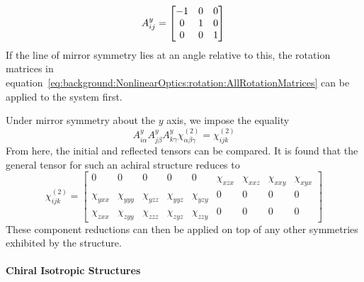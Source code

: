 \begin{equation}\label{eq:background:NonlinearOptics:mirror:yReflect}
	A^{y}_{ij} =
	\begin{bmatrix}
		-1 & 0 & 0\\ 
		0 & 1 & 0\\ 
		0 & 0 & 1
	\end{bmatrix}\\	
\end{equation}
If the line of mirror symmetry lies at an angle relative to this, the rotation matrices in equation~\ref{eq:background:NonlinearOptics:rotation:AllRotationMatrices} can be applied to the system first. 

Under mirror symmetry about the $y$ axis, we impose the equality
\begin{equation}\label{eq:background:NonlinearOptics:mirror:MirrorSymmetry}
	A^{y}_{i\alpha}A^{y}_{j\beta}A^{y}_{k\gamma}\chi^{(2)}_{\alpha \beta \gamma}
	=\chi^{(2)}_{ijk}
\end{equation}
From here, the initial and reflected tensors can be compared. It is found that the general tensor for such an achiral structure reduces to
\begin{equation}\label{eq:background:NonlinearOptics:mirror:chiMirrory}
	\chi^{(2)}_{ijk} =
	\begin{bmatrix}
		0 & 0 & 0 & 0 & 0 & \chi_{xzx} & \chi_{xxz} & \chi_{xxy} & \chi_{xyx}\\ 
		\chi_{yxx} & \chi_{yyy} & \chi_{yzz} & \chi_{yyz} & \chi_{yzy} & 0 & 0 & 0 & 0\\ 
		\chi_{zxx} & \chi_{zyy} & \chi_{zzz} & \chi_{zyz} & \chi_{zzy} & 0 & 0 & 0 & 0
	\end{bmatrix}
\end{equation}
These component reductions can then be applied on top of any other symmetries exhibited by the structure.

\paragraph{Chiral Isotropic Structures}
\label{sec:ChiralIso}


